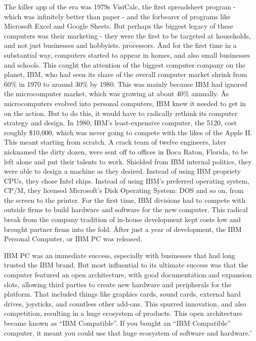 The killer app of the era was 1979s VisiCalc, the first spreadsheet program - which was infinitely better than paper
- and the forbearer of programs like Microsoft Excel and Google Sheets. But perhaps the biggest legacy of these
computers was their marketing - they were the first to be targeted at households, and not just businesses and
hobbyists. processors. \v

And for the first time in a substantial way, computers started to appear in homes, and also small businesses and
schools. This caught the attention of the biggest computer company on the planet, IBM, who had seen its share of the
overall computer market shrink from 60\% in 1970 to around 30\% by 1980. This was mainly because IBM had ignored the
microcomputer market, which was growing at about 40\% annually. \v

As microcomputers evolved into personal computers, IBM knew it needed to get in on the action. But to do this, it
would have to radically rethink its computer strategy and design. In 1980, IBM's least-expensive computer, the 5120,
cost roughly \$10,000, which was never going to compete with the likes of the Apple II. This meant starting from
scratch. A crack team of twelve engineers, later nicknamed the dirty dozen, were sent off to offices in Boca Raton,
Florida, to be left alone and put their talents to work. Shielded from IBM internal politics, they were able to
design a machine as they desired. Instead of using IBM propriety CPUs, they chose Intel chips. Instead of using IBM's
preferred operating system, CP/M, they licensed Microsoft's Disk Operating System: DOS and so on, from the screen to
the printer. For the first time, IBM divisions had to compete with outside firms to build hardware and software for
the new computer. This radical break from the company tradition of in-house development kept costs low and brought
partner firms into the fold. \v

After just a year of development, the IBM Personal Computer, or IBM PC was released.


IBM PC was an immediate success, especially with businesses that had long trusted the IBM brand. But most influential
to its ultimate success was that the computer featured an open architecture, with good documentation and expansion
slots, allowing third parties to create new hardware and peripherals for the platform. That included things like
graphics cards, sound cards, external hard drives, joysticks, and countless other add-ons. This spurred innovation,
and also competition, resulting in a huge ecosystem of products. This open architecture became known as ``IBM
Compatible''. If you bought an ``IBM Compatible'' computer, it meant you could use that huge ecosystem of software
and hardware. \v

